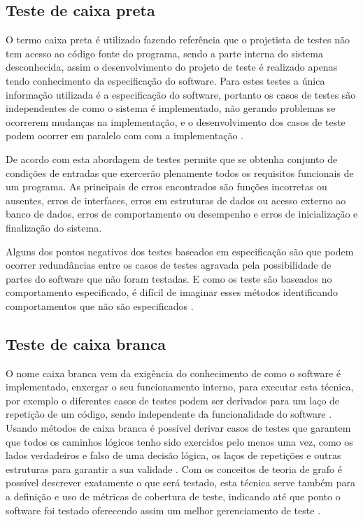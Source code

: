 \documentclass[dm,ppgcomp]{texfurg} %
\begin{document}
\subsection{Teste de caixa preta}

O termo caixa preta é utilizado fazendo referência que o projetista de testes não tem acesso ao código fonte do programa, sendo a parte interna do sistema desconhecida, assim o desenvolvimento do projeto de teste é realizado apenas tendo conhecimento da especificação do software. Para estes testes a única informação utilizada é a especificação do software, portanto os casos de testes são independentes de como o sistema é implementado, não gerando problemas se ocorrerem mudanças na implementação, e o desenvolvimento dos casos de teste podem ocorrer em paralelo com com a implementação \cite{jorgensen2016software}.

De acordo com \cite{pressman2005software} esta abordagem de testes permite que se obtenha conjunto de condições de entradas que exercerão plenamente todos os requisitos funcionais de um programa. As principais de erros encontrados são funções incorretas ou ausentes, erros de interfaces, erros em estruturas de dados ou acesso externo ao banco de dados, erros de comportamento ou desempenho e erros de inicialização e finalização do sistema.

Alguns dos pontos negativos dos testes baseados em especificação são que podem ocorrer redundâncias entre os casos de testes agravada pela possibilidade de partes do software que não foram testadas. E como os teste são baseados no comportamento especificado, é difícil de imaginar esses métodos identificando comportamentos que não são especificados \cite{jorgensen2016software}.

\subsection{Teste de caixa branca}

O nome caixa branca vem da exigência do conhecimento de como o software é implementado, enxergar o seu funcionamento interno, para executar esta técnica, por exemplo o diferentes casos de testes podem ser derivados para um laço de repetição de um código, sendo independente da funcionalidade do software \cite{graham2008foundations}. Usando métodos de caixa branca é possível derivar casos de testes que garantem que todos os caminhos lógicos tenho sido exercidos pelo menos uma vez, como os lados verdadeiros e falso de uma decisão lógica, os laços de repetições e outras estruturas para garantir a sua validade \cite{pressman2005software}. Com os conceitos de teoria de grafo é possível descrever exatamente o que será testado, esta técnica serve também para a definição e uso de métricas de cobertura de teste, indicando até que ponto o software foi testado oferecendo assim um melhor gerenciamento de teste \cite{jorgensen2016software}.
\end{document}
